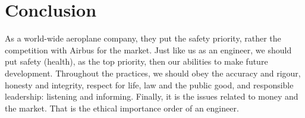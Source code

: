 \documentclass{article}
\begin{document}
\section{Conclusion}
As a world-wide aeroplane company, they put the safety priority, rather the competition with Airbus for the market. Just like us as an engineer, we should put safety (health), as the top priority, then our abilities to make future development. Throughout the practices, we should obey the accuracy and rigour, honesty and integrity, respect for life, law and the public good, and responsible leadership: listening and informing. Finally, it is the issues related to money and the market. That is the ethical importance order of an engineer.


\end{document}
